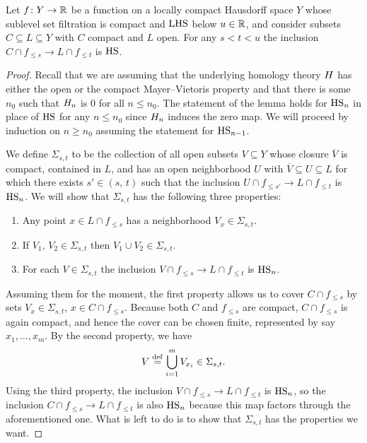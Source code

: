 \begin{lem} \label{l:key lemma for q-tameness}
	Let $f \colon Y \to \mathbb{R}$ be a function on a locally compact Hausdorff space $Y$ whose sublevel set filtration is compact and $\mathrm{LHS}$ below $u \in \mathbb{R}$, and consider subsets $C \subseteq L \subseteq Y$ with $C$ compact and $L$ open.
	For any $s < t < u$ the inclusion $C \cap f_{\leq s} \to L \cap f_{\leq t}$ is $\mathrm{HS}$.
\end{lem}

\begin{proof}
	Recall that we are assuming that the underlying homology theory $H$ has either the open or the compact Mayer--Vietoris property and that there is some $n_0$ such that $H_{n}$ is 0 for all $n \leq n_0$.
	The statement of the lemma holds for $\mathrm{HS}_{n}$ in place of $\mathrm{HS}$ for any $n \leq n_0$ since $H_{n}$ induces the zero map.
	We will proceed by induction on $n \geq n_0$ assuming the statement for $\mathrm{HS}_{n-1}$.

	We define $\Sigma_{s, t}$ to be the collection of all open subsets $V \subseteq Y$ whose closure $\overline{V}$ is compact, contained in $L$, and has an open neighborhood $U$ with $\overline{V} \subseteq U \subseteq L$	for which there exists $s' \in (s,\, t)$ such that the inclusion $U \cap f_{\leq s'} \to L \cap f_{\leq t}$ is $\mathrm{HS}_n$.
	We will show that $\Sigma_{s, t}$ has the following three properties:
	\begin{enumerate}
		\item Any point $x \in L \cap f_{\leq s}$ has a neighborhood $V_x \in \Sigma_{s,t}$.
		\item If $V_1,\, V_2 \in \Sigma_{s,t}$ then $V_1 \cup V_2 \in \Sigma_{s,t}$.
		\item For each $V \in \Sigma_{s,t}$ the inclusion
		$V \cap f_{\leq s} \to L \cap f_{\leq t}$ is $\mathrm{HS}_n$.
	\end{enumerate}

	Assuming them for the moment, the first property allows us to cover $C \cap f_{\leq s}$ by sets $V_x \in \Sigma_{s,t}$, $x \in C \cap f_{\leq s}$.
	Because both $C$ and $f_{\leq s}$ are compact, $C \cap f_{\leq s}$ is again compact, and hence the cover can be chosen finite, represented by say $x_1,\dots, x_m$.
	By the second property, we have
	\[V \stackrel{\mathrm{def}}{=} \bigcup_{i = 1}^m V_{x_i} \in \Sigma_{s,t}.\]
	Using the third property, the inclusion
	$V \cap f_{\leq s} \to L \cap f_{\leq t}$
	is $\mathrm{HS}_n$, so the inclusion
	$C \cap f_{\leq s} \to L \cap f_{\leq t}$
	is also $\mathrm{HS}_n$ because this map factors through the aforementioned one.
	What is left to do is to show that $\Sigma_{s,t}$ has the properties we want.


\end{proof}

